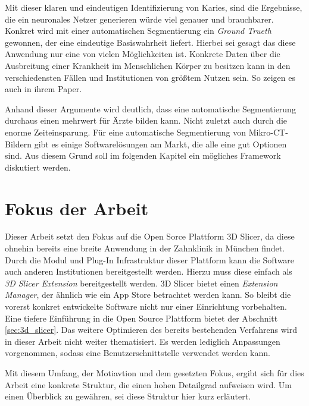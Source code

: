 Mit dieser klaren und eindeutigen Identifizierung von Karies, sind die Ergebnisse,
die ein neuronales Netzer generieren würde viel genauer und brauchbarer. Konkret
wird mit einer automatischen Segmentierung ein \textit{Ground Trueth} gewonnen, der
eine eindeutige Basiswahrheit liefert. Hierbei sei gesagt das diese Anwendung
nur eine von vielen Möglichkeiten ist. Konkrete Daten über die Ausbreitung einer
Krankheit im Menschlichen Körper zu besitzen kann in den verschiedensten Fällen und
Institutionen von größtem Nutzen sein. So zeigen es auch \citet{de20083d} in ihrem
Paper.

Anhand dieser Argumente wird deutlich, dass eine automatische Segmentierung
durchaus einen mehrwert für Ärzte bilden kann. Nicht zuletzt auch durch die enorme
Zeiteinsparung. Für eine automatische Segmentierung von Mikro-CT-Bildern gibt es
einige Softwarelösungen am Markt, die alle eine gut Optionen sind. Aus diesem
Grund soll im folgenden Kapitel ein mögliches Framework diskutiert werden.

\section{Fokus der Arbeit}
\label{sec:fokus_der-arbeit} Dieser Arbeit setzt den Fokus auf die Open Sorce
Plattform 3D Slicer, da diese ohnehin bereits eine breite Anwendung in der Zahnklinik
in München findet. Durch die Modul und Plug-In Infrastruktur dieser Plattform
kann die Software auch anderen Institutionen bereitgestellt werden. Hierzu muss diese
einfach als \textit{3D Slicer Extension} bereitgestellt werden. 3D Slicer bietet
einen \textit{Extension Manager}, der ähnlich wie ein App Store betrachtet werden
kann. So bleibt die vorerst konkret entwickelte Software nicht nur einer
Einrichtung vorbehalten. Eine tiefere Einführung in die Open Source Plattform bietet
der Abschnitt \ref{sec:3d_slicer}. Das weitere Optimieren des bereits
bestehenden Verfahrens wird in dieser Arbeit nicht weiter thematisiert. Es werden
lediglich Anpassungen vorgenommen, sodass eine Benutzerschnittstelle verwendet
werden kann.

Mit diesem Umfang, der Motiavtion und dem gesetzten Fokus, ergibt sich für dies
Arbeit eine konkrete Struktur, die einen hohen Detailgrad aufweisen wird. Um
einen Überblick zu gewähren, sei diese Struktur hier kurz erläutert.


